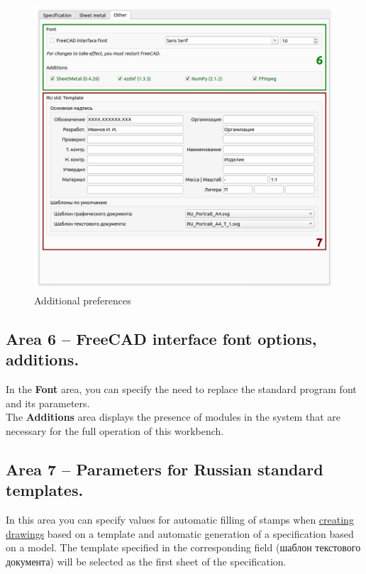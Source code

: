 \documentclass[a4paper,12pt]{article}
\begin{document}
\begin{figure}[htp]
	\centering
	\includegraphics[width=1\textwidth]{img/pref_other.png}
	\caption{Additional preferences}
	\label{sec:pref_other}
\end{figure}

\subsection{Area 6 -- FreeCAD interface font options, additions.}
In the \textbf{Font} area, you can specify the need to replace the standard program font and its parameters.\\The \textbf{Additions} area displays the presence of modules in the system that are necessary for the full operation of this workbench.

\subsection{Area 7 -- Parameters for Russian standard templates.}
In this area you can specify values ​​for automatic filling of stamps when \hyperref[sec:8]{creating drawings} based on a template and automatic generation of a specification based on a model. The template specified in the corresponding field (шаблон текстового документа) will be selected as the first sheet of the specification.

\pagebreak
\end{document}
